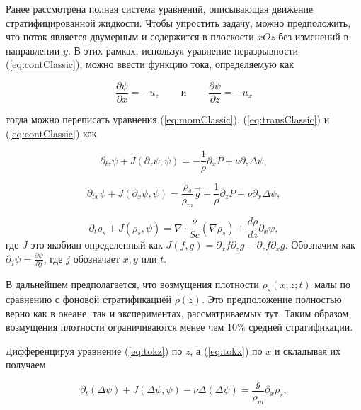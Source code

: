 Ранее рассмотрена полная система уравнений, описывающая движение стратифицированной жидкости. Чтобы упростить задачу, можно предположить, что поток является двумерным и содержится в плоскости $xOz$ без изменений в направлении $y$. В этих рамках, используя уравнение неразрывности (\ref{eq:contClassic}), можно ввести функцию тока, определяемую как

\begin{equation}
    \frac{\partial \psi}{\partial x} = - u_z \;\;\;\;\;\;\;\; и \;\;\;\;\;\;\;\; \frac{\partial \psi}{\partial z} = - u_x
\end{equation}

тогда можно переписать уравнения (\ref{eq:momClassic}), (\ref{eq:transClassic}) и (\ref{eq:contClassic}) как

\begin{equation}
    \partial_{tz} \psi + J(\partial_z \psi, \psi) = - \frac{1}{\rho} \partial_x P + \nu \partial_z \Delta \psi,
    \label{eq:tokz}
\end{equation}

\begin{equation}
    \partial_{tx} \psi + J(\partial_x \psi, \psi) = \frac{\rho_s}{\rho_m}\vec{g}+\frac{1}{\rho}\partial_z P + \nu \partial_x \Delta \psi,
    \label{eq:tokx}
\end{equation}

\begin{equation}
    \partial_t \rho_s + J(\rho_s,\psi) = \nabla \cdot \frac{\nu}{Sc} (\nabla \rho_s) + \frac{d \rho}{dz} \partial_x \psi,
\end{equation}
где $J$ это якобиан определенный как $J(f,g) = \partial_x f \partial_z g - \partial_z f \partial_x g.$ Обозначим как $\partial_j \psi =\frac{\partial \psi}{\partial j}$, где $j$ обозначает $x,y$ или $t$. 

В дальнейшем предполагается, что возмущения плотности $\rho_s(x; z; t)$ малы по сравнению с фоновой стратификацией $\rho(z)$. Это предположение полностью верно как в океане, так и экспериментах, рассматриваемых тут. Таким образом, возмущения плотности ограничиваются менее чем 10\% средней стратификации. 

Дифференцируя уравнение (\ref{eq:tokz}) по $z$, а (\ref{eq:tokx}) по $x$ и складывая их получаем

\begin{equation}
    \partial_t(\Delta \psi) + J (\Delta \psi, \psi) - \nu \Delta (\Delta \psi) = \frac{g}{\rho_m} \partial_x \rho_s,
    \label{eq:tokzz}
\end{equation}

